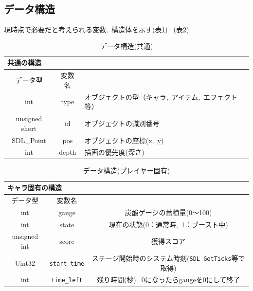 \documentclass[dvipdfmx]{jsarticle}
\begin{document}
\subsection{データ構造}
%
現時点で必要だと考えられる変数,\ 構造体を示す(表\ref{table1-1}) \ (表\ref{table1-2})
\begin{table}[htb]
    \begin{center}
        \caption{データ構造(共通)}
        \label{table1-1}
        \begin{tabular}{|c||c|l|}\hline
            \multicolumn{3}{|l|}{共通の構造}\\ \hline
            データ型 & 変数名 &  \\ \hline \hline
            int & type & オブジェクトの型（キャラ,\ アイテム,\ エフェクト等） \\ \hline
            unsigned short & id & オブジェクトの識別番号 \\ \hline
            SDL\_Point & pos & オブジェクトの座標(x,\ y) \\ \hline
            int & depth & 描画の優先度(深さ) \\ \hline
        \end{tabular}
    \end{center}
\end{table}

\begin{table}[htb]
    \begin{center}
        \caption{データ構造(プレイヤー固有)}
        \label{table1-2}
        \begin{tabular}{|c||c|c|}\hline
            \multicolumn{3}{|l|}{キャラ固有の構造}\\ \hline
            データ型 & 変数名 &  \\ \hline \hline
            int & gauge & 炭酸ゲージの蓄積量(0〜100) \\ \hline
            int & state & 現在の状態(0：通常時,\ 1：ブースト中) \\ \hline
            unsigned int & score & 獲得スコア \\ \hline
            Uint32 & \verb+start_time+ & ステージ開始時のシステム時刻(\verb+SDL_GetTicks+等で取得)\\ \hline
            int & \verb+time_left+ & 残り時間(秒).\ 0になったらgaugeを0にして終了\\ \hline
        \end{tabular}
    \end{center}
\end{table}
\end{document}
